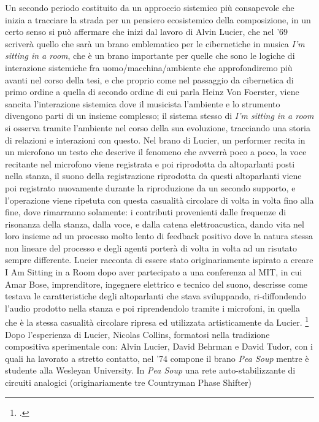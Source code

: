Un secondo periodo costituito da un approccio sistemico più consapevole
che inizia a tracciare la strada per un pensiero ecosistemico della composizione,
in un certo senso si può affermare che inizi dal lavoro
di Alvin Lucier, che nel '69 scriverà quello che sarà un brano emblematico per
le cibernetiche in musica \textit{I'm sitting in a room},
che è un brano importante per quelle che sono
le logiche di interazione sistemiche fra uomo/macchina/ambiente che approfondiremo 
più avanti nel corso della tesi,
e che proprio come nel passaggio da cibernetica di primo 
ordine a quella di secondo ordine di cui parla Heinz Von Foerster, 
viene sancita l'interazione sistemica dove il musicista l'ambiente e lo strumento
divengono parti di un insieme complesso;
il sistema stesso di \textit{I'm sitting in a room} si osserva tramite l'ambiente 
nel corso della sua evoluzione, tracciando una storia di relazioni e interazioni 
con questo.
Nel brano di Lucier, un performer
recita in un microfono un testo che descrive il fenomeno che avverrà poco a poco,
la voce recitante nel microfono viene registrata e poi riprodotta da altoparlanti
posti nella stanza, il suono della registrazione riprodotta da questi altoparlanti
viene poi registrato nuovamente durante la riproduzione da un secondo supporto, e l'operazione
viene ripetuta con questa casualità circolare di volta in volta
fino alla fine, dove rimarranno
solamente: i contributi provenienti dalle frequenze di risonanza della stanza,
dalla voce, e dalla catena elettroacustica,
dando vita nel loro insieme ad un processo molto lento di feedback positivo dove
la natura stessa non lineare del processo e degli agenti porterà di volta in volta ad un risutato
sempre differente.
Lucier racconta di essere stato originariamente ispirato
a creare I Am Sitting in a Room dopo aver partecipato a una conferenza al MIT,
in cui Amar Bose, imprenditore, ingegnere elettrico e tecnico del suono,
descrisse come testava le caratteristiche degli altoparlanti
che stava sviluppando, ri-diffondendo l'audio prodotto nella stanza e poi
riprendendolo tramite i microfoni, in quella che è la stessa casualità
circolare ripresa ed utilizzata artisticamente da Lucier. \footcite{lucierbose} 
Dopo l'esperienza di Lucier, Nicolas Collins,
formatosi nella tradizione compositiva sperimentale con: Alvin Lucier,
David Behrman e David Tudor, con i quali ha lavorato a stretto contatto,
nel '74 compone il brano \textit{Pea Soup} mentre è studente alla Wesleyan University.
In \textit{Pea Soup} una rete auto-stabilizzante di circuiti analogici
(originariamente tre Countryman Phase Shifter)
